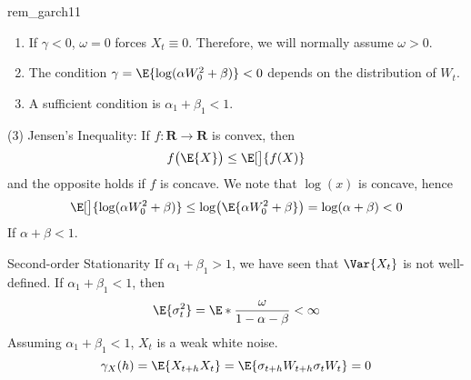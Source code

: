 \begin{Remark}{}{rem_garch11}
    \begin{enumerate}[(1)]
        \item If $ \gamma<0 $, $ \omega=0 $ forces $ X_t\equiv 0 $. Therefore, we will
              normally assume $ \omega>0 $.
        \item The condition $ \gamma=\E{\log(\alpha W_0^2+\beta)}<0 $ depends
              on the distribution of $ W_t $.
        \item A sufficient condition is $ \alpha_1+\beta_1<1 $.
    \end{enumerate}
\end{Remark}
\begin{Proof}{ (3)}{}
    Jensen's Inequality: If $ f:\mathbf{R}\to\mathbf{R} $ is convex, then
    \[ f\bigl(\E{X}\bigr)\le \E[\big]{f(X)} \]
    and the opposite holds if $ f $ is concave. We note that $ \log(x) $
    is concave, hence
    \[ \E[\big]{\log(\alpha W_0^2+\beta)}\le \log\bigl(\E{\alpha W_0^2+\beta}\bigr)=\log(\alpha+\beta)<0 \]
    If $ \alpha+\beta<1 $.
\end{Proof}
\begin{Remark}{Second-order Stationarity}{}
    If $ \alpha_1+\beta_1>1 $, we have seen that $ \Var{X_t} $ is not well-defined.
    If $ \alpha_1+\beta_1<1 $, then
    \[ \E{\sigma_t^2}=\E*{\frac{\omega}{1-\alpha-\beta}}<\infty \]
    Assuming $ \alpha_1+\beta_1<1 $, $ X_t $ is a weak white noise.
    \[ \gamma_X(h)=\E{X_{t+h}X_t}=\E{\sigma_{t+h}W_{t+h}\sigma_t W_t}=0 \]
\end{Remark}

